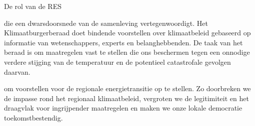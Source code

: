 \begin{voorstel}{De rol van de RES}
\begin{multicols*}{2}
\begin{overwegingen}

\end{overwegingen}

\begin{aanbevelingen}
 die een dwarsdoorsnede van de samenleving vertegenwoordigt. Het Klimaatburgerberaad doet bindende voorstellen over klimaatbeleid gebaseerd op informatie van wetenschappers, experts en belanghebbenden.
De taak van het beraad is om maatregelen vast te stellen die ons beschermen tegen een onnodige verdere stijging van de temperatuur en de potentieel catastrofale gevolgen daarvan.

 om voorstellen voor de regionale energietransitie op te stellen.
Zo doorbreken we de impasse rond het regionaal klimaatbeleid, vergroten we de legitimiteit en het draagvlak voor ingrijpender maatregelen en maken we onze lokale democratie toekomstbestendig.

\end{aanbevelingen}

\end{multicols*}

\end{voorstel}
